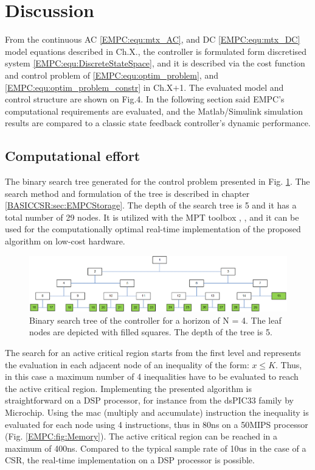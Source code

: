 \section{Discussion}\label{EMPC:sec:Discussion}

    From the continuous AC \ref{EMPC:equ:mtx_AC}, and DC \ref{EMPC:equ:mtx_DC} model equations described in Ch.X., the controller is formulated form discretised system \ref{EMPC:equ:DiscreteStateSpace}, and it is described via the cost function and control problem of \ref{EMPC:equ:optim_problem}, and \ref{EMPC:equ:optim_problem_constr} in Ch.X$+$1. The evaluated model and control structure are shown on Fig.4. In the following section said EMPC’s computational requirements are evaluated, and the Matlab/Simulink simulation results are compared to a classic state feedback controller’s dynamic performance.

    \subsection{Computational effort}\label{EMPC:sec:CompEffort}

    The binary search tree generated for the control problem presented in Fig. \ref{EMPC:fig:SearchTree}. The search method and formulation of the tree is described in chapter \ref{BASICCSR:sec:EMPCStorage}. The depth of the search tree is 5 and it has a total number of 29 nodes. It is utilized with the MPT toolbox \cite{muthukumar2016adaptive}, \cite{kutasi2010constrained}, and it can be used for the computationally optimal real-time implementation of the proposed algorithm on low-cost hardware.

    \begin{figure}[!ht]
        \centering
        \includegraphics[width=\textwidth]{EMPC_PNG_Pics/SearchTree.png}
        \caption{Binary search tree of the controller for a horizon of N = 4. The leaf nodes are depicted with filled squares. The depth of the tree is 5.}
        \label{EMPC:fig:SearchTree}
    \end{figure}

    The search for an active critical region starts from the first level and represents the evaluation in each adjacent node of an inequality of the form: $x\leq K$. Thus, in this case a maximum number of 4 inequalities have to be evaluated to reach the active critical region. Implementing the presented algorithm is straightforward on a DSP processor, for instance from the dsPIC33 family by Microchip. Using the mac (multiply and accumulate) instruction the inequality is evaluated for each node using 4 instructions, thus in 80ns on a 50MIPS processor (Fig. \ref{EMPC:fig:Memory}). The active critical region can be reached in a maximum of 400ns. Compared to the typical sample rate of 10us in the case of a CSR, the real-time implementation on a DSP processor is possible.

